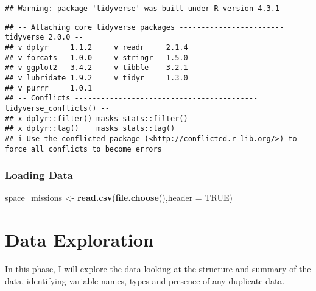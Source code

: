 \documentclass[
]{article}
\newenvironment{Shaded}{\begin{snugshade}}{\end{snugshade}}
\newcommand{\AttributeTok}[1]{\textcolor[rgb]{0.13,0.29,0.53}{#1}}
\newcommand{\ConstantTok}[1]{\textcolor[rgb]{0.56,0.35,0.01}{#1}}
\newcommand{\FunctionTok}[1]{\textcolor[rgb]{0.13,0.29,0.53}{\textbf{#1}}}
\newcommand{\NormalTok}[1]{#1}
\newcommand{\OtherTok}[1]{\textcolor[rgb]{0.56,0.35,0.01}{#1}}
\newcommand{\SpecialCharTok}[1]{\textcolor[rgb]{0.81,0.36,0.00}{\textbf{#1}}}
\begin{document}
\begin{Shaded}
\end{Shaded}

\begin{verbatim}
## Warning: package 'tidyverse' was built under R version 4.3.1
\end{verbatim}

\begin{verbatim}
## -- Attaching core tidyverse packages ------------------------ tidyverse 2.0.0 --
## v dplyr     1.1.2     v readr     2.1.4
## v forcats   1.0.0     v stringr   1.5.0
## v ggplot2   3.4.2     v tibble    3.2.1
## v lubridate 1.9.2     v tidyr     1.3.0
## v purrr     1.0.1     
## -- Conflicts ------------------------------------------ tidyverse_conflicts() --
## x dplyr::filter() masks stats::filter()
## x dplyr::lag()    masks stats::lag()
## i Use the conflicted package (<http://conflicted.r-lib.org/>) to force all conflicts to become errors
\end{verbatim}

\hypertarget{loading-data}{%
\subsubsection{Loading Data}\label{loading-data}}

\begin{Shaded}
\begin{Highlighting}[]
\NormalTok{space\_missions }\OtherTok{\textless{}{-}} \FunctionTok{read.csv}\NormalTok{(}\FunctionTok{file.choose}\NormalTok{(),}\AttributeTok{header =} \ConstantTok{TRUE}\NormalTok{)}
\end{Highlighting}
\end{Shaded}

\hypertarget{data-exploration}{%
\section{Data Exploration}\label{data-exploration}}

In this phase, I will explore the data looking at the structure and
summary of the data, identifying variable names, types and presence of
any duplicate data.
\end{document}
